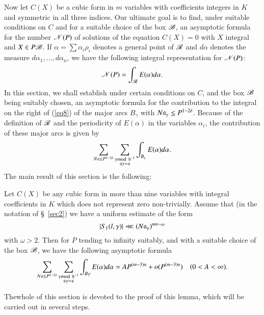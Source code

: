 Now let $C(X)$ be a cubic form in $m$ variables with coefficients 
integers in $K$ and symmetric in all three indices. Our ultimate goal 
is to find, under suitable conditions on $C$ and for a suitable choice 
of the box $\mathscr{B}$, an asymptotic formula for the number $\mathscr{N}(P)$ of 
solutions of the equation $C(X)=0$ with $X$ integral and $X\in P\mathscr{B}$. 
If $\alpha=\sum\alpha_i\rho_i$ denotes a general point of $\mathscr{R}$ and 
$d\alpha$ denotes the measure $d\alpha_1,\ldots,d\alpha_n$, we have 
the following integral representation for $\mathscr{N}(P)$:
\begin{equation}\label{eq8}
\mathscr{N}(P)=\int_{\mathscr{R}} E(\alpha)d\alpha.
\end{equation}
In this section, we shall establish under certain conditions on $C$, 
and the box $\mathscr{B}$ being suitably chosen, an asymptotic formula for the 
contribution to the integral on the right of (\ref{eq8}) of the major 
arcs $B_\gamma$ with $N\mathfrak{a}_\gamma\leq P^{1-2\delta}$. Because of the 
definition of $\mathscr{R}$ and the periodicity of $E(\alpha)$ in the 
variables $\alpha_i$, the contribution of these major arcs is given by
$$
\sum\limits_{N\mathfrak{a}\leq P^{1-2\delta}}\sum\limits_{\substack{\gamma{\rm{mod}}\kern.3em 
\mathfrak{d}^{-1}\\\mathfrak{a}\gamma=\mathfrak{a}}}\int_{B_\gamma}E(\alpha)d\alpha.
$$
The main result of this section is the following:
\begin{lemma}\label{lem3.1}
Let $C(X)$ be any cubic form in more than nine variables with integral 
coefficients in $K$ which does not represent zero non-trivially. 
Assume that (in the notation of \S~\ref{sec2}) we have a uniform 
estimate of the form
$$
|S_1(l,\gamma)|\lll (N\mathfrak{a}_\gamma)^{mn-\omega}
$$
with $\omega>2$. Then for $P$ tending to infinity suitably, and with a 
suitable choice of the box $\mathscr{B}$, we have the following asymptotic 
formula
$$
\sum\limits_{N\mathfrak{a}\leq P^{1-2\delta}}\sum\limits_{\substack{\gamma{\rm{mod}}\kern.3em 
\mathfrak{d}^{-1}\\\mathfrak{a}\gamma=\mathfrak{a}}}\int_{B\gamma}E(\alpha)d\alpha=AP^{(m-3)n} 
+o(P^{(m-3)n})\quad (0<A<\infty). 
$$
\end{lemma}

The\pageoriginale whole of this section is devoted to the proof of 
this lemma, which will be carried out in several steps.

